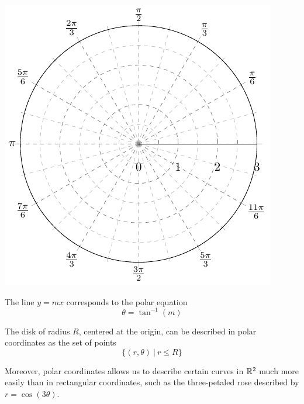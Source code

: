     \begin{center}
        \includegraphics{chapters/4-IntegrationRn/figures/figures-polaraxes.pdf}
    \end{center}

\begin{example}
    The line $y=mx$ corresponds to the polar equation $$\theta = \tan^{-1}(m)$$  
\end{example}

\begin{example}
    The disk of radius $R$, centered at the origin, can be described in polar coordinates as the set of points $$\{(r,\theta) \ | \ r \leq R\}$$
\end{example}

Moreover, polar coordinates allows us to describe certain curves in $\mathbb{R}^2$ much more easily than in rectangular coordinates, such as the three-petaled rose described by $r = \cos(3\theta)$.


